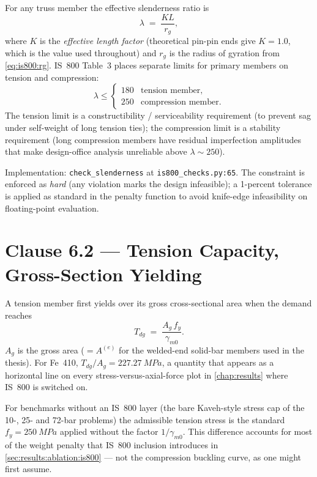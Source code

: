 For any truss member the effective slenderness ratio is
\begin{equation}
  \lambda \;=\; \frac{K L}{r_g},
  \label{eq:is800:slenderness}
\end{equation}
where $K$ is the \emph{effective length factor} (theoretical pin-pin
ends give $K=\num{1.0}$, which is the value used throughout) and
$r_g$ is the radius of gyration from
\cref{eq:is800:rg}. IS~800 Table~3 places separate limits for
primary members on tension and compression:
\begin{equation}
  \lambda \le
  \begin{cases}
    \num{180} & \text{tension member}, \\
    \num{250} & \text{compression member}.
  \end{cases}
  \label{eq:is800:slend_limits}
\end{equation}
The tension limit is a constructibility / serviceability
requirement (to prevent sag under self-weight of long tension
ties); the compression limit is a stability requirement (long
compression members have residual imperfection amplitudes that
make design-office analysis unreliable above $\lambda\sim 250$).

Implementation: \texttt{check\_slenderness} at
\texttt{is800\_checks.py:65}. The constraint is enforced as
\emph{hard} (any violation marks the design infeasible); a
\num{1}-percent tolerance is applied as standard in the penalty
function to avoid knife-edge infeasibility on floating-point
evaluation.

\section{Clause 6.2 --- Tension Capacity, Gross-Section Yielding}
\label{app:is800:clause6_2}

A tension member first yields over its gross cross-sectional area
when the demand reaches
\begin{equation}
  T_{dg} \;=\; \frac{A_g\,f_y}{\gamma_{m0}}.
  \label{eq:is800:Tdg}
\end{equation}
$A_g$ is the gross area ($=A^{(e)}$ for the welded-end solid-bar
members used in the thesis). For Fe~410,
$T_{dg}/A_g = \SI{227.27}{MPa}$, a quantity that appears as a
horizontal line on every stress-versus-axial-force plot in
\cref{chap:results} where IS~800 is switched on.

For benchmarks without an IS~800 layer (the bare Kaveh-style
stress cap of the 10-, 25- and 72-bar problems) the admissible
tension stress is the standard $f_y=\SI{250}{MPa}$ applied
without the factor $1/\gamma_{m0}$. This difference accounts for
most of the weight penalty that IS~800 inclusion introduces in
\cref{sec:results:ablation:is800} --- not the compression
buckling curve, as one might first assume.


